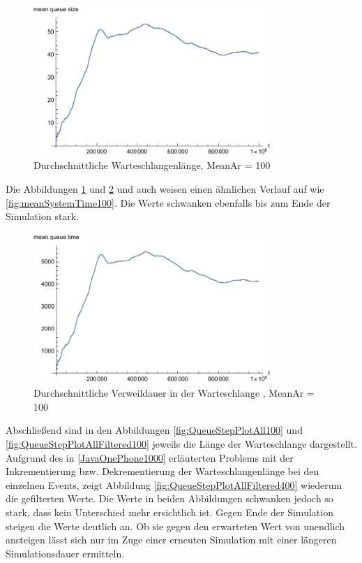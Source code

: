 \begin{figure}[htpb]
	\centering
	\includegraphics[width=0.8\textwidth]{abbildungen/1_Phone/Arrival_100_Serve_100_dur_1000000_Skip_0/MeanQueueSize.pdf}
	\caption{Durchschnittliche Warteschlangenlänge, MeanAr = 100}
	\label{fig:meanQueueSize100}
\end{figure}

Die Abbildungen \ref{fig:meanQueueSize100} und \ref{fig:meanQueueTime100} und auch weisen einen ähnlichen Verlauf auf wie \ref{fig:meanSystemTime100}. Die Werte schwanken ebenfalls bis zum Ende der Simulation stark.

\begin{figure}[htpb]
	\centering
	\includegraphics[width=0.8\textwidth]{abbildungen/1_Phone/Arrival_100_Serve_100_dur_1000000_Skip_0/MeanQueueTime.pdf}
	\caption{Durchschnittliche Verweildauer in der Warteschlange , MeanAr = 100}
	\label{fig:meanQueueTime100}
\end{figure} 

Abschließend sind in den Abbildungen \ref{fig:QueueStepPlotAll100} und \ref{fig:QueueStepPlotAllFiltered100} jeweils die Länge der Warteschlange dargestellt. Aufgrund des in \ref{JavaOnePhone1000} erläuterten Problems mit der Inkrementierung bzw. Dekrementierung der Warteschlangenlänge bei den einzelnen Events, zeigt Abbildung \ref{fig:QueueStepPlotAllFiltered400} wiederum die gefilterten Werte. Die Werte in beiden Abbildungen schwanken jedoch so stark, dass kein Unterschied mehr ersichtlich ist. Gegen Ende der Simulation steigen die Werte deutlich an. Ob sie gegen den erwarteten Wert von unendlich ansteigen lässt sich nur im Zuge einer erneuten Simulation mit einer längeren Simulationsdauer ermitteln.

